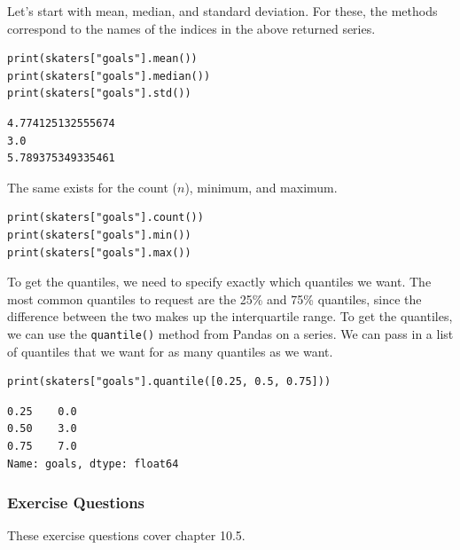 Let's start with mean, median, and standard deviation. For these, the methods correspond to the names of the indices in the above returned series.\par
\begin{lstlisting}[style=pippython]
print(skaters["goals"].mean())
print(skaters["goals"].median())
print(skaters["goals"].std())
\end{lstlisting}
\begin{lstlisting}[style=none]
4.774125132555674
3.0
5.789375349335461
\end{lstlisting}
The same exists for the count ($n$), minimum, and maximum.\par
\begin{lstlisting}[style=pippython]
print(skaters["goals"].count())
print(skaters["goals"].min())
print(skaters["goals"].max())
\end{lstlisting}
To get the quantiles, we need to specify exactly which quantiles we want. The most common quantiles to request are the 25\% and 75\% quantiles, since the difference between the two makes up the interquartile range. To get the quantiles, we can use the \verb|quantile()| method from Pandas on a series. We can pass in a list of quantiles that we want for as many quantiles as we want.\par
\begin{lstlisting}[style=pippython]
print(skaters["goals"].quantile([0.25, 0.5, 0.75]))
\end{lstlisting}
\begin{lstlisting}[style=none]
0.25    0.0
0.50    3.0
0.75    7.0
Name: goals, dtype: float64
\end{lstlisting}

\subsubsection*{Exercise Questions}
These exercise questions cover chapter 10.5.
\begin{Exercise}
\end{Exercise}


